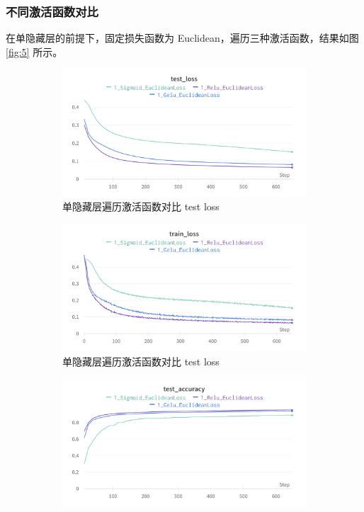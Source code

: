 \documentclass{article}
\begin{document}
\subsubsection{不同激活函数对比}

在单隐藏层的前提下，固定损失函数为 Euclidean，遍历三种激活函数，结果如图 \ref{fig:5} 所示。

\begin{figure}[htbp]
	\centering
	\begin{subfigure}{0.475\textwidth}
		\centering
		\includegraphics[width=1\textwidth]{../pics/单层激活函数test_loss.png}
		\caption{单隐藏层遍历激活函数对比 test loss}
	\end{subfigure}
	\begin{subfigure}{0.475\textwidth}
		\centering
		\includegraphics[width=1\textwidth]{../pics/单层激活函数train_loss.png}
		\caption{单隐藏层遍历激活函数对比 test loss}
	\end{subfigure}
	\begin{subfigure}{0.475\textwidth}
		\centering
		\includegraphics[width=1\textwidth]{../pics/单层激活函数test_acc.png}

\end{subfigure}
\end{figure}
\end{document}
